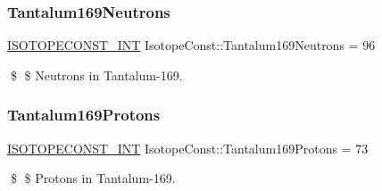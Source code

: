 \subsubsection{\texorpdfstring{Tantalum169\+Neutrons}{Tantalum169Neutrons}}
{\footnotesize\ttfamily \mbox{\hyperlink{group___isotope_const-_macros_ga5f18360b3e99483a35c32d789e62621c}{I\+S\+O\+T\+O\+P\+E\+C\+O\+N\+S\+T\+\_\+\+I\+NT}} Isotope\+Const\+::\+Tantalum169\+Neutrons = 96}

\$ \$ Neutrons in Tantalum-\/169. \mbox{\label{group___isotope_const-_tantalum-_ta169_ga179c4e0c53045b8a78471c74c126e377}} 
\subsubsection{\texorpdfstring{Tantalum169\+Protons}{Tantalum169Protons}}
{\footnotesize\ttfamily \mbox{\hyperlink{group___isotope_const-_macros_ga5f18360b3e99483a35c32d789e62621c}{I\+S\+O\+T\+O\+P\+E\+C\+O\+N\+S\+T\+\_\+\+I\+NT}} Isotope\+Const\+::\+Tantalum169\+Protons = 73}

\$ \$ Protons in Tantalum-\/169. 